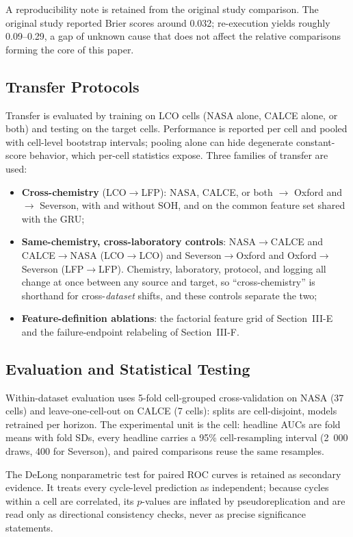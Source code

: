 \documentclass[preprint,12pt]{elsarticle}
\begin{document}
A reproducibility note is retained from the original study comparison. The original study \cite{shikdar2026learning} reported Brier scores around 0.032; re-execution yields roughly 0.09--0.29, a gap of unknown cause that does not affect the relative comparisons forming the core of this paper.

\subsection{Transfer Protocols}
Transfer is evaluated by training on LCO cells (NASA alone, CALCE alone, or both) and testing on the target cells. Performance is reported per cell and pooled with cell-level bootstrap intervals; pooling alone can hide degenerate constant-score behavior, which per-cell statistics expose. Three families of transfer are used:

\begin{itemize}
\item \textbf{Cross-chemistry} (LCO$\to$LFP): NASA, CALCE, or both $\to$ Oxford and $\to$ Severson, with and without SOH, and on the common feature set shared with the GRU;
\item \textbf{Same-chemistry, cross-laboratory controls}: NASA$\to$CALCE and CALCE$\to$NASA (LCO$\to$LCO) and Severson$\to$Oxford and Oxford$\to$Severson (LFP$\to$LFP). Chemistry, laboratory, protocol, and logging all change at once between any source and target, so ``cross-chemistry'' is shorthand for cross-\emph{dataset} shifts, and these controls separate the two;
\item \textbf{Feature-definition ablations}: the factorial feature grid of Section~III-E and the failure-endpoint relabeling of Section~III-F.
\end{itemize}

\subsection{Evaluation and Statistical Testing}
\label{sec:eval}
Within-dataset evaluation uses 5-fold cell-grouped cross-validation on NASA (37 cells) and leave-one-cell-out on CALCE (7 cells): splits are cell-disjoint, models retrained per horizon. The experimental unit is the cell: headline AUCs are fold means with fold SDs, every headline carries a 95\% cell-resampling interval (2~000 draws, 400 for Severson), and paired comparisons reuse the same resamples.

The DeLong nonparametric test \cite{delong1988comparing} for paired ROC curves is retained as secondary evidence. It treats every cycle-level prediction as independent; because cycles within a cell are correlated, its $p$-values are inflated by pseudoreplication and are read only as directional consistency checks, never as precise significance statements.
\end{document}
